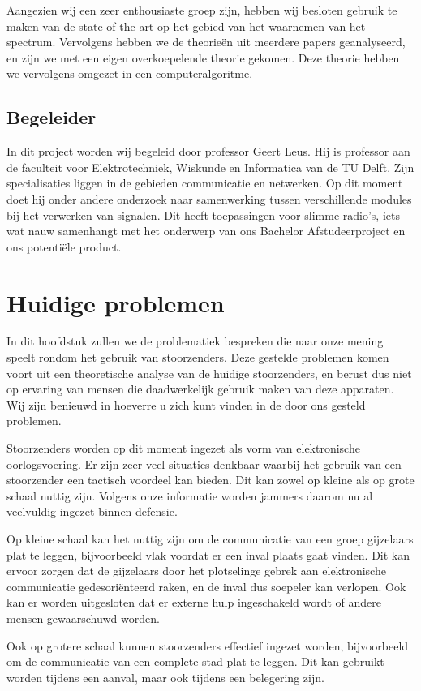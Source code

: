 \documentclass[oneside, a4paper, openany]{memoir}
\begin{document}
Aangezien wij een zeer enthousiaste groep zijn, hebben wij besloten gebruik te maken van de state-of-the-art op het gebied van het waarnemen van het spectrum. Vervolgens hebben we de theorieën uit meerdere papers geanalyseerd, en zijn we met een eigen overkoepelende theorie gekomen. Deze theorie hebben we vervolgens omgezet in een computeralgoritme.

\section{Begeleider}
In dit project worden wij begeleid door professor Geert Leus. Hij is professor aan de faculteit voor Elektrotechniek, Wiskunde en Informatica van de TU Delft. Zijn specialisaties liggen in de gebieden communicatie en netwerken. Op dit moment doet hij onder andere onderzoek naar samenwerking tussen verschillende modules bij het verwerken van signalen. Dit heeft toepassingen voor slimme radio's, iets wat nauw samenhangt met het onderwerp van ons Bachelor Afstudeerproject en ons potentiële product.

\chapter{Huidige problemen}
In dit hoofdstuk zullen we de problematiek bespreken die naar onze mening speelt rondom het gebruik van stoorzenders. Deze gestelde problemen komen voort uit een theoretische analyse van de huidige stoorzenders, en berust dus niet op ervaring van mensen die daadwerkelijk gebruik maken van deze apparaten. Wij zijn benieuwd in hoeverre u zich kunt vinden in de door ons gesteld problemen.

Stoorzenders worden op dit moment ingezet als vorm van elektronische oorlogsvoering. Er zijn zeer veel situaties denkbaar waarbij het gebruik van een stoorzender een tactisch voordeel kan bieden. Dit kan zowel op kleine als op grote schaal nuttig zijn. Volgens onze informatie worden jammers daarom nu al veelvuldig ingezet binnen defensie.

Op kleine schaal kan het nuttig zijn om de communicatie van een groep gijzelaars plat te leggen, bijvoorbeeld vlak voordat er een inval plaats gaat vinden. Dit kan ervoor zorgen dat de gijzelaars door het plotselinge gebrek aan elektronische communicatie gedesoriënteerd raken, en de inval dus soepeler kan verlopen. Ook kan er worden uitgesloten dat er externe hulp ingeschakeld wordt of andere mensen gewaarschuwd worden.

Ook op grotere schaal kunnen stoorzenders effectief ingezet worden, bijvoorbeeld om de communicatie van een complete stad plat te leggen. Dit kan gebruikt worden tijdens een aanval, maar ook tijdens een belegering zijn.
\end{document}
